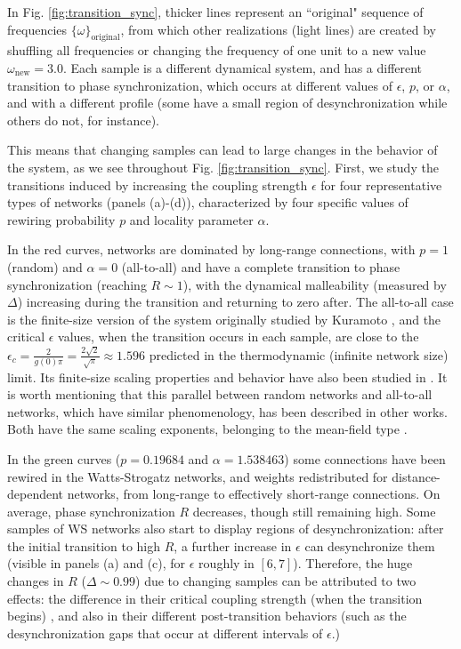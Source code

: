 In Fig. \ref{fig:transition_sync}, thicker lines represent an ``original" sequence of frequencies $\{\omega\}_\mathrm{original}$, from which other realizations (light lines) are created by shuffling all frequencies or changing the frequency of one unit to a new value $\omega_\mathrm{new} = 3.0$. Each sample is a different dynamical system, and has a different transition to phase synchronization, which occurs at different values of $\epsilon$, $p$, or $\alpha$, and with a different profile (some have a small region of desynchronization while others do not, for instance). 

This means that changing samples can lead to large changes in the behavior of the system, as we see throughout Fig. \ref{fig:transition_sync}. First, we study the transitions induced by increasing the coupling strength $\epsilon$ for four representative types of networks (panels (a)-(d)), characterized by four specific values of rewiring probability $p$ and locality parameter $\alpha$.

In the red curves, networks are dominated by long-range connections, with $p = 1$ (random) and $\alpha = 0$ (all-to-all)  and have a complete transition to phase synchronization (reaching $R \sim 1$), with the dynamical malleability (measured by $\Delta$) increasing during the transition and returning to zero after.
The all-to-all case is the finite-size version of the system originally studied by Kuramoto  \cite{kuramoto1984chemical}, and the critical $\epsilon$ values, when the transition occurs in each sample, are close to the $\epsilon_c = \frac{2}{g(0)\pi} = \frac{2\sqrt{2}}{\sqrt{\pi}} \approx 1.596$ predicted in the thermodynamic (infinite network size) limit. Its finite-size scaling properties and behavior have also been studied in \cite{hong2007entrainment, peter2018transition}. It is worth mentioning that this parallel between random networks and all-to-all networks, which have similar phenomenology, has been described in other works. Both have the same scaling exponents, belonging to the mean-field type \cite{skardal2020higher, hong2013link}. 

In the green curves ($p = 0.19684$ and $\alpha = 1.538463$) some connections have been rewired in the Watts-Strogatz networks, and weights redistributed for distance-dependent networks, from long-range to effectively short-range connections. On average, phase synchronization $R$ decreases, though still remaining high. Some samples of WS networks also start to display regions of desynchronization: after the initial transition to high $R$, a further increase in $\epsilon$ can desynchronize them (visible in panels (a) and (c), for $\epsilon$ roughly in $[6,7]$). Therefore, the huge changes in $R$ ($\Delta \sim 0.99$) due to changing samples can be attributed to two effects: the difference in their critical coupling strength (when the transition begins) \cite{hong2006anomalous}, and also in their different post-transition behaviors (such as the desynchronization gaps that occur at different intervals of $\epsilon$.)

